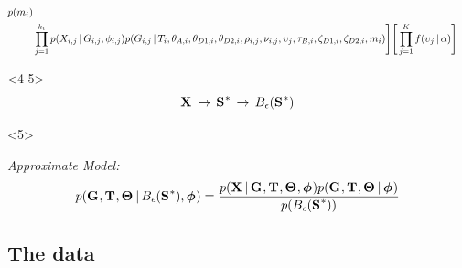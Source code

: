 \begin{frame}[t]
\begin{onlyenv}
\begin{displaybox}
{\begin{equation*}
\begin{split}
        p(\migrationRate{i}) \\
        &
        \prod_{j=1}^{\nloci{i}}
        p(\alignment{i}{j} \given
        \geneTree{i}{j}, \hkyModel{i}{j})
        p(\geneTree{i}{j} \given
        \divTimeMap{i},
        \ancestralTheta{i}, \descendantTheta{1}{i}, \descendantTheta{2}{i},
        \ploidyScalar{i}{j}, \mutationRateScalarConstant{i}{j},
        \locusMutationRateScalar{j},
        \bottleTime{i}, \bottleScalar{1}{i}, \bottleScalar{2}{i},
        \migrationRate{i})
        \Bigg]
        \Bigg[
        \prod_{j=1}^{\nlociTotal}
        f(\locusMutationRateScalar{j} \given \locusRateHetShapeParameter)
        \Bigg]
        \label{eq:fullmodel}
        \end{split}
    \end{equation*}
    }
    \end{displaybox}
    \end{onlyenv}
    \begin{onlyenv}<4-5>
    \smallskip
        \[ \alignmentVector \, \to \, \ssVectorObs \, \to \, \ssSpace\]
    \end{onlyenv}
    \begin{onlyenv}<5>
    \begin{block}{\it Approximate Model:}
    \[
        p(\geneTreeVector, \divTimeMapVector, \demographicParamVector
        \given
        \ssSpace, \hkyModelVector) =
        \frac{p(\alignmentVector \given \geneTreeVector, \divTimeMapVector,
        \demographicParamVector, \hkyModelVector)
        p(\geneTreeVector, \divTimeMapVector, \demographicParamVector \given \hkyModelVector)}{
        p(\ssSpace)}
    \]\vspace{0mm}
    \end{block}
    \end{onlyenv}
\end{frame}

\subsection{The data}

